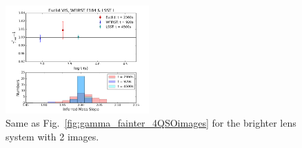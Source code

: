\documentclass[a4paper,11pt]{article}
\begin{document}
\begin{figure}
\begin{center}
\includegraphics[width=0.49\textwidth]{figures/gamma_hist_0330_2QSO_EWL.png}
\end{center}
\caption{Same as Fig.~\ref{fig:gamma_fainter_4QSOimages} for the brighter lens system with 2 images.
\label{fig:gamma_brighter_2QSOimages}}
\end{figure}
\end{document}
